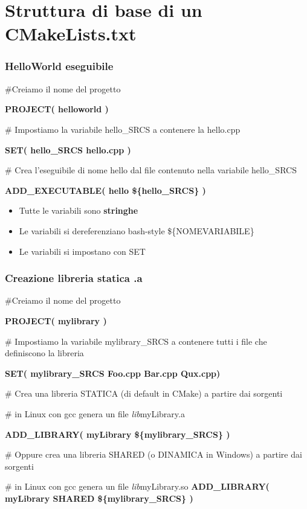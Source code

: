 \documentclass[12pt] {beamer}
\begin{document}

\section{Struttura di base di un CMakeLists.txt}

\begin{frame}
	\frametitle{HelloWorld eseguibile}
\begin{small}
\#Creiamo il nome del progetto

\textbf{PROJECT( helloworld )}

\# Impostiamo la variabile hello\_SRCS a contenere la hello.cpp

\textbf{SET( hello\_SRCS hello.cpp )}

\# Crea l'eseguibile di nome hello dal file contenuto nella variabile hello\_SRCS

\textbf{ADD\_EXECUTABLE( hello \$\{hello\_SRCS\} )}

\begin{itemize}
	\item Tutte le variabili sono \textbf{stringhe}
	\item Le variabili si dereferenziano bash-style \$\{NOMEVARIABILE\}
	\item Le variabili si impostano con SET
\end{itemize}
\end{small}
\end{frame}


\begin{frame}
	\frametitle{Creazione libreria statica .a}
\begin{small}
\#Creiamo il nome del progetto

\textbf{PROJECT( mylibrary )}

\# Impostiamo la variabile mylibrary\_SRCS a contenere tutti i file che definiscono la libreria

\textbf{SET( mylibrary\_SRCS Foo.cpp Bar.cpp Qux.cpp)}

\# Crea una libreria STATICA (di default in CMake) a partire dai sorgenti

\# in Linux con gcc genera un file \emph{lib}myLibrary.a

\textbf{ADD\_LIBRARY( myLibrary \$\{mylibrary\_SRCS\} )}

\# Oppure crea una libreria SHARED (o DINAMICA in Windows) a partire dai sorgenti

\# in Linux con gcc genera un file \emph{lib}myLibrary.so
\textbf{ADD\_LIBRARY( myLibrary SHARED \$\{mylibrary\_SRCS\} )}
\end{small}
\end{frame}
\end{document}
